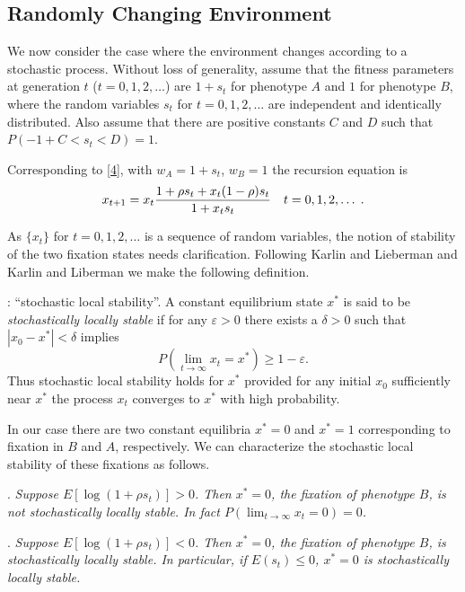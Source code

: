 \documentclass[9pt,twocolumn,twoside,lineno]{pnas-new}
\newcommand{\var}{\varepsilon}
\begin{document}
 
\subsection{Randomly Changing Environment}
 
 We now consider the  case where the environment changes according to a stochastic process. Without loss of generality, assume that the fitness parameters at generation $t$ ($t=0,1,2,\dots$) are $1+s_t$ for phenotype $A$ and $1$ for phenotype $B$, where the random variables $s_t$ for $t=0,1,2,\dots$ are independent and identically distributed. Also assume that there are positive constants $C$ and $D$ such that $P(-1+C<s_t <D)=1$.
 
 Corresponding to \eqref{4}, with $w_A=1+s_t$, $w_B=1$ the recursion equation is
 \begin{equation}
 x_{t+1}=x_t {1+\rho s_t +x_t(1-\rho)s_t\over 1+x_ts_t}\quad t=0,1,2,\dots\; .\label{28}\end{equation}
 
\noindent As $\{x_t\}$ for $t=0,1,2,\dots$ is a sequence of random variables, the notion of stability of the two fixation states needs clarification. Following Karlin and Lieberman \cite{karlin1974random} and Karlin and Liberman \cite{karlin1975random} we make the following definition.
 \medskip
 
 : ``stochastic local stability''.
 A constant equilibrium state $x^*$ is said to be {\sl stochastically locally stable} if for any $\var>0$ there exists a $\delta>0$ such that $|x_0-x^*|<\delta$ implies
 \begin{equation}
 P\left(\lim_{t\to\infty}x_t =x^*\right)\ge 1-\var.\label{29}\end{equation}
 Thus stochastic local stability holds for $x^*$ provided for any initial $x_0$ sufficiently near $x^*$ the process $x_t$ converges to $x^*$ with high probability.
 
 In our case there are two constant equilibria $x^*=0$ and $x^*=1$ corresponding to fixation in $B$ and $A$, respectively. We can characterize the stochastic local stability of these fixations as follows.
 \medskip
 
 . {\sl Suppose $E\left[\log (1+\rho s_t)\right]>0$. Then $x^*=0$, the fixation of phenotype $B$, is not stochastically locally stable. In fact $P\left(\lim_{t\to\infty}x_t=0\right)=0$.}
 \medskip
 
  . {\sl Suppose $E[\log(1+\rho s_t)]<0$. Then $x^*=0$, the fixation of phenotype $B$, is stochastically locally stable. In particular, if $E(s_t)\le 0$, $x^*=0$ is stochastically locally stable.}
\smallskip
 
\end{document}
